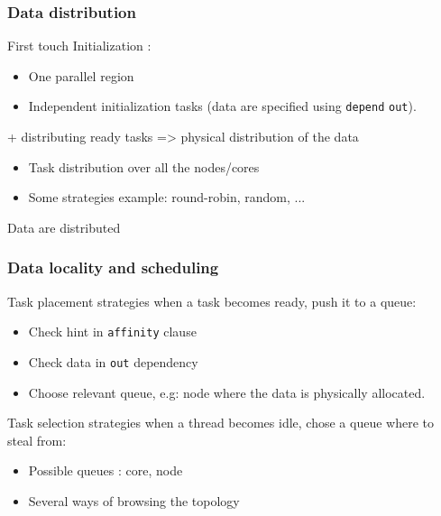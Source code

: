 \documentclass[xcolor={usenames,dvipsnames,svgnames,table}, aspectratio=43]{beamer}
\begin{document}
\begin{frame}[fragile]
  \frametitle{Data distribution}
  \begin{block}{First touch}
    Initialization :
    \begin{itemize}
      \item One parallel region
      \item Independent initialization tasks (data are specified using \verb/depend/ \verb/out/).
    \end{itemize}
  \end{block}
  \begin{block}{+ distributing ready tasks => physical distribution of the data}
    \begin{itemize}
      \item Task distribution over all the nodes/cores
      \item Some strategies example: round-robin, random, ...
    \end{itemize}
  \end{block}
  \alert{Data are distributed}
\end{frame}





\begin{frame}[fragile]
  \frametitle{Data locality and scheduling}

  \begin{block}{Task placement strategies}
    when a task becomes ready, push it to a queue:
    \begin{itemize}
      \item Check hint in \verb/affinity/ clause
      \item Check data in \verb/out/ dependency
      \item Choose relevant queue, e.g: node where the data is physically allocated.
    \end{itemize}
  \end{block}

  \begin{block}{Task selection strategies}
    when a thread becomes idle, chose a queue where to steal from:
    \begin{itemize}
      \item Possible queues : core, node
      \item Several ways of browsing the topology
    \end{itemize}
  \end{block}

\end{frame}
\end{document}
